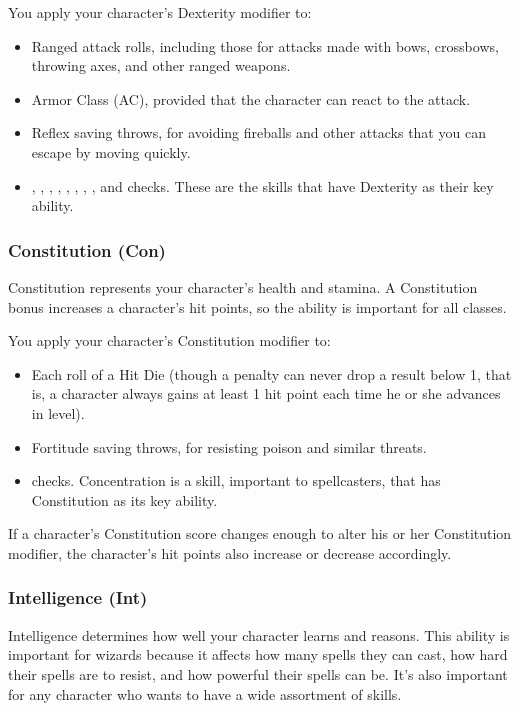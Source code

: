 You apply your character's Dexterity modifier to:
\begin{itemize}
\item Ranged attack rolls, including those for attacks made with bows, crossbows, throwing 
axes, and other ranged weapons.
\item Armor Class (AC), provided that the character can react to the attack.
\item Reflex saving throws, for avoiding fireballs and other attacks that you can escape 
by moving quickly.
\item {}, , , , , , , 
, and  checks. These are the skills that have Dexterity as their 
key ability.
\end{itemize}

\subsubsection{Constitution (Con)}

Constitution represents your character's health and stamina. A Constitution bonus 
increases a character's hit points, so the ability is important for all classes.

You apply your character's Constitution modifier to:
\begin{itemize}
\item Each roll of a Hit Die (though a penalty can never drop a result below 1, that 
is, a character always gains at least 1 hit point each time he or she advances 
in level).
\item Fortitude saving throws, for resisting poison and similar threats.
\item {} checks. Concentration is a skill, important to spellcasters, that 
has Constitution as its key ability.
\end{itemize}
If a character's Constitution score changes enough to alter his or her Constitution 
modifier, the character's hit points also increase or decrease accordingly.

\subsubsection{Intelligence (Int)}

Intelligence determines how well your character learns and reasons. This ability 
is important for wizards because it affects how many spells they can cast, how 
hard their spells are to resist, and how powerful their spells can be. It's also 
important for any character who wants to have a wide assortment of skills.


